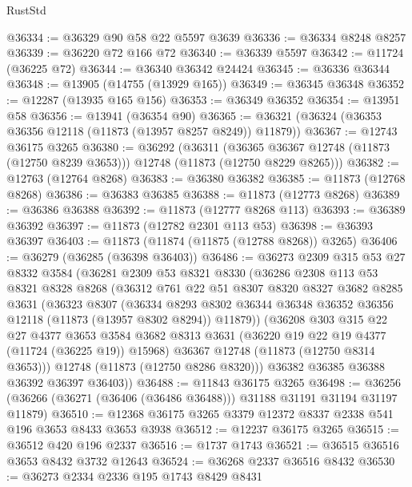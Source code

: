 \begin{lexlean}{RustStd}
\begin{coremodule}
@36334 := @36329 @90 @58 @22 @5597 @3639
@36336 := @36334 @8248 @8257
@36339 := @36220 @72 @166 @72
@36340 := @36339 @5597
@36342 := @11724 (@36225 @72)
@36344 := @36340 @36342 @24424
@36345 := @36336 @36344
@36348 := @13905 (@14755 (@13929 @165))
@36349 := @36345 @36348
@36352 := @12287 (@13935 @165 @156)
@36353 := @36349 @36352
@36354 := @13951 @58
@36356 := @13941 (@36354 @90)
@36365 := @36321 (@36324 (@36353 @36356 @12118 (@11873 (@13957 @8257 @8249)) @11879))
@36367 := @12743 @36175 @3265
@36380 := @36292
    (@36311
      (@36365 @36367 @12748 (@11873 (@12750 @8239 @3653)))
      @12748
      (@11873 (@12750 @8229 @8265)))
@36382 := @12763 (@12764 @8268)
@36383 := @36380 @36382
@36385 := @11873 (@12768 @8268)
@36386 := @36383 @36385
@36388 := @11873 (@12773 @8268)
@36389 := @36386 @36388
@36392 := @11873 (@12777 @8268 @113)
@36393 := @36389 @36392
@36397 := @11873 (@12782 @2301 @113 @53)
@36398 := @36393 @36397
@36403 := @11873 (@11874 (@11875 (@12788 @8268)) @3265)
@36406 := @36279 (@36285 (@36398 @36403))
@36486 := @36273
    @2309
    @315
    @53
    @27
    @8332
    @3584
    (@36281
      @2309
      @53
      @8321
      @8330
      (@36286
        @2308
        @113
        @53
        @8321
        @8328
        @8268
        (@36312
          @761
          @22
          @51
          @8307
          @8320
          @8327
          @3682
          @8285
          @3631
          (@36323
            @8307
            (@36334
              @8293
              @8302
              @36344
              @36348
              @36352
              @36356
              @12118
              (@11873 (@13957 @8302 @8294))
              @11879))
          (@36208
            @303
            @315
            @22
            @27
            @4377
            @3653
            @3584
            @3682
            @8313
            @3631
            (@36220 @19 @22 @19 @4377 (@11724 (@36225 @19)) @15968)
            @36367
            @12748
            (@11873 (@12750 @8314 @3653)))
          @12748
          (@11873 (@12750 @8286 @8320)))
        @36382
        @36385
        @36388
        @36392
        @36397
        @36403))
@36488 := @11843 @36175 @3265
@36498 := @36256 (@36266 (@36271 (@36406 (@36486 @36488))) @31188 @31191 @31194 @31197 @11879)
@36510 := @12368 @36175 @3265 @3379 @12372 @8337 @2338 @541 @196 @3653 @8433 @3653 @3938
@36512 := @12237 @36175 @3265
@36515 := @36512 @420 @196 @2337
@36516 := @1737 @1743
@36521 := @36515 @36516 @3653 @8432 @3732 @12643
@36524 := @36268 @2337 @36516 @8432
@36530 := @36273 @2334 @2336 @195 @1743 @8429 @8431

\end{coremodule}
\end{lexlean}
